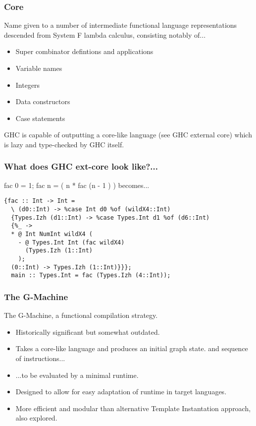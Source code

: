 \documentclass{beamer}
\begin{document}
\begin{frame}
	\frametitle{Core}
	Name given to a number of intermediate functional language
	representations descended from System F lambda calculus,
	consisting notably of...
	\begin{itemize}
		\item Super combinator defintions and applications
		\item Variable names
		\item Integers
		\item Data constructors
		\item Case statements
	\end{itemize}
	GHC is capable of outputting a core-like language (see
	GHC external core) which is lazy and type-checked by GHC
	itself.
\end{frame}

\begin{frame}[fragile]
	\frametitle{What does GHC ext-core look like?...}
	fac 0 = 1; fac n = ( n * fac (n - 1 ) ) becomes...
\begin{verbatim}
{fac :: Int -> Int =
  \ (d0::Int) -> %case Int d0 %of (wildX4::Int)
  {Types.Izh (d1::Int) -> %case Types.Int d1 %of (d6::Int)
  {%_ ->
  * @ Int NumInt wildX4 (
    - @ Types.Int Int (fac wildX4) 
      (Types.Izh (1::Int)
    );
  (0::Int) -> Types.Izh (1::Int)}}};
  main :: Types.Int = fac (Types.Izh (4::Int));
\end{verbatim}

\end{frame}

\begin{frame}
	\frametitle{The G-Machine}

	The G-Machine, a functional compilation strategy.
	\begin{itemize}
		\item Historically significant but somewhat outdated.
		\item Takes a core-like language and produces an initial
			  graph state.
			  and sequence of instructions...
		\item ...to be evaluated by a minimal runtime.
		\item Designed to allow for easy adaptation of runtime
			  in target languages.
		\item More efficient and modular than alternative Template
			  Instantation approach, also explored.
	\end{itemize}
	
\end{frame}
	
\end{document}
